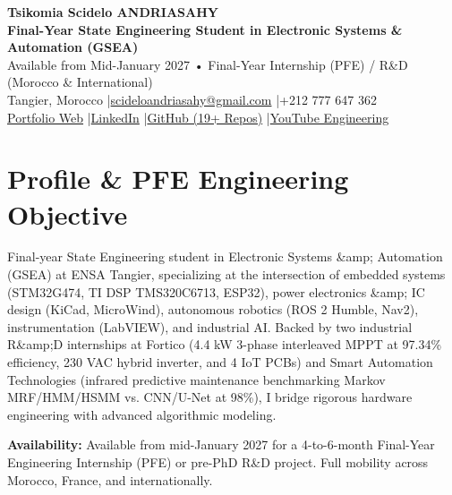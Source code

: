 \documentclass[10pt,a4paper]{article}
\begin{document}
\begin{center}
{\LARGE\bfseries Tsikomia Scidelo ANDRIASAHY}\\[0.5ex]
{\large\color{cyanacc}\bfseries Final-Year State Engineering Student in Electronic Systems \& Automation (GSEA)}\\[0.4ex]
{\small Available from Mid-January 2027 • Final-Year Internship (PFE) / R\&D (Morocco \& International)}\\[0.5ex]
{\small Tangier, Morocco \quad|\quad \href{mailto:scideloandriasahy@gmail.com}{scideloandriasahy@gmail.com} \quad|\quad +212 777 647 362}\\[0.3ex]
{\small \href{https://scidelo-andriasahy.github.io/}{Portfolio Web} \quad|\quad \href{https://www.linkedin.com/in/scidelo}{LinkedIn} \quad|\quad \href{https://github.com/scidelo-andriasahy}{GitHub (19+ Repos)} \quad|\quad \href{https://www.youtube.com/channel/UCqIzu57g0aMRBuQBv294gXw}{YouTube Engineering}}
\end{center}
\section*{Profile \& PFE Engineering Objective}
\noindent Final-year State Engineering student in Electronic Systems \&amp; Automation (GSEA) at ENSA Tangier, specializing at the intersection of embedded systems (STM32G474, TI DSP TMS320C6713, ESP32), power electronics \&amp; IC design (KiCad, MicroWind), autonomous robotics (ROS 2 Humble, Nav2), instrumentation (LabVIEW), and industrial AI. Backed by two industrial R\&amp;D internships at Fortico (4.4 kW 3-phase interleaved MPPT at 97.34\% efficiency, 230 VAC hybrid inverter, and 4 IoT PCBs) and Smart Automation Technologies (infrared predictive maintenance benchmarking Markov MRF/HMM/HSMM vs. CNN/U-Net at 98\%), I bridge rigorous hardware engineering with advanced algorithmic modeling.\par\vspace{0.5ex}
\noindent\textbf{Availability: }Available from mid-January 2027 for a 4-to-6-month Final-Year Engineering Internship (PFE) or pre-PhD R\&D project. Full mobility across Morocco, France, and internationally.
\end{document}
